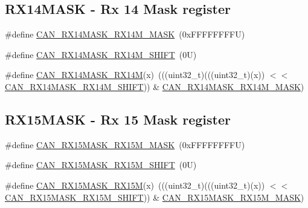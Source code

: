 \subsection*{R\+X14\+M\+A\+SK -\/ Rx 14 Mask register}
\begin{DoxyCompactItemize}
\item 
\#define \mbox{\hyperlink{group___c_a_n___register___masks_ga4687420a607d4279e24fa93f4b486ec3}{C\+A\+N\+\_\+\+R\+X14\+M\+A\+S\+K\+\_\+\+R\+X14\+M\+\_\+\+M\+A\+SK}}~(0x\+F\+F\+F\+F\+F\+F\+F\+F\+U)
\item 
\#define \mbox{\hyperlink{group___c_a_n___register___masks_ga9e74b131e8180656fe9eb73191b73869}{C\+A\+N\+\_\+\+R\+X14\+M\+A\+S\+K\+\_\+\+R\+X14\+M\+\_\+\+S\+H\+I\+FT}}~(0\+U)
\item 
\#define \mbox{\hyperlink{group___c_a_n___register___masks_ga23bf60adcf45d8330ade3f9cb43578a6}{C\+A\+N\+\_\+\+R\+X14\+M\+A\+S\+K\+\_\+\+R\+X14M}}(x)~(((uint32\+\_\+t)(((uint32\+\_\+t)(x)) $<$$<$ \mbox{\hyperlink{group___c_a_n___register___masks_ga9e74b131e8180656fe9eb73191b73869}{C\+A\+N\+\_\+\+R\+X14\+M\+A\+S\+K\+\_\+\+R\+X14\+M\+\_\+\+S\+H\+I\+FT}})) \& \mbox{\hyperlink{group___c_a_n___register___masks_ga4687420a607d4279e24fa93f4b486ec3}{C\+A\+N\+\_\+\+R\+X14\+M\+A\+S\+K\+\_\+\+R\+X14\+M\+\_\+\+M\+A\+SK}})
\end{DoxyCompactItemize}
\subsection*{R\+X15\+M\+A\+SK -\/ Rx 15 Mask register}
\begin{DoxyCompactItemize}
\item 
\#define \mbox{\hyperlink{group___c_a_n___register___masks_gaf81f33076f662d5f4c737076e36e93b7}{C\+A\+N\+\_\+\+R\+X15\+M\+A\+S\+K\+\_\+\+R\+X15\+M\+\_\+\+M\+A\+SK}}~(0x\+F\+F\+F\+F\+F\+F\+F\+F\+U)
\item 
\#define \mbox{\hyperlink{group___c_a_n___register___masks_ga1420efdd894578fe2a31563c25b58e59}{C\+A\+N\+\_\+\+R\+X15\+M\+A\+S\+K\+\_\+\+R\+X15\+M\+\_\+\+S\+H\+I\+FT}}~(0\+U)
\item 
\#define \mbox{\hyperlink{group___c_a_n___register___masks_ga38935337048fdd5cb3b222d00047f4fe}{C\+A\+N\+\_\+\+R\+X15\+M\+A\+S\+K\+\_\+\+R\+X15M}}(x)~(((uint32\+\_\+t)(((uint32\+\_\+t)(x)) $<$$<$ \mbox{\hyperlink{group___c_a_n___register___masks_ga1420efdd894578fe2a31563c25b58e59}{C\+A\+N\+\_\+\+R\+X15\+M\+A\+S\+K\+\_\+\+R\+X15\+M\+\_\+\+S\+H\+I\+FT}})) \& \mbox{\hyperlink{group___c_a_n___register___masks_gaf81f33076f662d5f4c737076e36e93b7}{C\+A\+N\+\_\+\+R\+X15\+M\+A\+S\+K\+\_\+\+R\+X15\+M\+\_\+\+M\+A\+SK}})
\end{DoxyCompactItemize}
